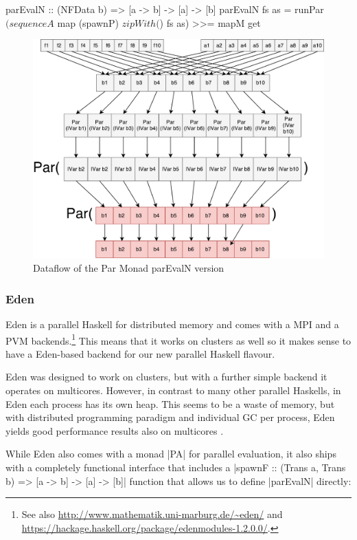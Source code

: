 \begin{code}
parEvalN :: (NFData b) => [a -> b] -> [a] -> [b]
parEvalN fs as = runPar $ 
	(sequenceA $ map (spawnP) $ zipWith ($) fs as) >>= mapM get
\end{code}
\begin{figure}[h]
	\includegraphics[scale=0.5]{images/parEvalNParMonad}
	\caption{Dataflow of the Par Monad parEvalN version}
\end{figure}

\subsubsection{Eden}
Eden \cite{eden,Loogen2012} is a parallel Haskell for distributed memory and comes with a MPI and a PVM backends.\footnote{See also \url{http://www.mathematik.uni-marburg.de/~eden/} and \url{https://hackage.haskell.org/package/edenmodules-1.2.0.0/}.} This means that it works on clusters as well so it makes sense to have a Eden-based backend for our new parallel Haskell flavour.

Eden was designed to work on clusters, but with a further simple backend it operates on multicores. However, in contrast to many other parallel Haskells, in Eden each process has its own heap. This seems to be a waste of memory, but with distributed programming paradigm and individual GC per process, Eden yields good performance results also on multicores \cite{arcs-dc,aswad2009low}.

While Eden also comes with a monad |PA| for parallel evaluation, it also ships with a completely functional interface that includes
a |spawnF :: (Trans a, Trans b) => [a -> b] -> [a] -> [b]|
function that
allows us to define |parEvalN| directly:

